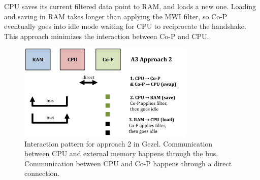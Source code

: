 CPU saves its current filtered data point to RAM, and loads a new one. Loading and saving in RAM takes longer than applying the MWI filter, so Co-P eventually goes into idle mode waiting for CPU to reciprocate the handshake. This approach minimizes the interaction between Co-P and CPU.

\begin{figure}[H]
    \centering
    \includegraphics[width=0.75\textwidth]{2Implementation/fig/interaction2.pdf}
    \caption{Interaction pattern for approach 2 in Gezel. Communication between CPU and external memory happens through the bus. Communication between CPU and Co-P happens through a direct connection.}
    \label{fig:interaction2}
\end{figure}
